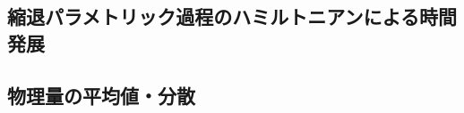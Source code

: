 \documentclass{report}
\begin{document}
  \subsection{縮退パラメトリック過程のハミルトニアンによる時間発展}
  \subsection{物理量の平均値・分散}
\end{document}
